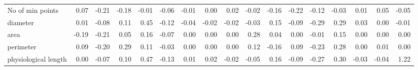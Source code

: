 \documentclass{article}
\begin{document}
\begin{table}[!ht]
{\begin{tabular}{lrrrrrrrrrrrrrrrr}
No of min points                                                        & 0.07                     & -0.21                    & -0.18                    & -0.01                    & -0.06                    & -0.01                    & 0.00                     & 0.02                     & -0.02                    & -0.16                    & -0.22                    & -0.12                    & -0.03                    & 0.01                     & 0.05                     & -0.05                    \\
diameter                                                                & 0.01                     & -0.08                    & 0.11                     & 0.45                     & -0.12                    & -0.04                    & -0.02                    & -0.02                    & -0.03                    & 0.15                     & -0.09                    & -0.29                    & 0.29                     & 0.03                     & 0.00                     & -0.01                    \\
area                                                                    & -0.19                    & -0.21                    & 0.05                     & 0.16                     & -0.07                    & 0.00                     & 0.00                     & 0.00                     & 0.28                     & 0.04                     & 0.00                     & -0.01                    & 0.15                     & 0.00                     & 0.00                     & 0.00                     \\
perimeter                                                               & 0.09                     & -0.20                    & 0.29                     & 0.11                     & -0.03                    & 0.00                     & 0.00                     & 0.00                     & 0.12                     & -0.16                    & 0.09                     & -0.23                    & 0.28                     & 0.00                     & 0.01                     & 0.00                     \\
physiological length                                                    & 0.00                     & -0.07                    & 0.10                     & 0.47                     & -0.13                    & 0.01                     & 0.02                     & -0.02                    & -0.05                    & 0.16                     & -0.09                    & -0.27                    & 0.30                     & -0.03                    & -0.04                    & 1.22                     \\

\end{tabular}}
\end{table}
\end{document}
